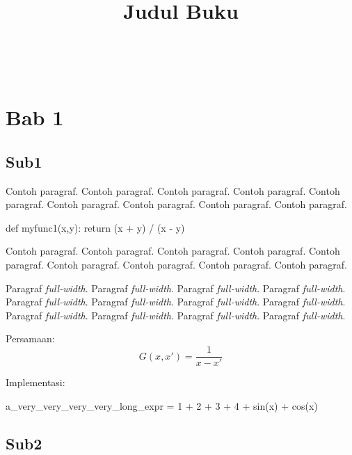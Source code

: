 \documentclass[twoside,bahasa]{tufte-book}
\title{Judul Buku}
\author[Fadjar \& Mariya]{\noindent{Fadjar Fathurrahman} \\[3mm]
\noindent{Mariya Al Qibtiya Nasution} \\[3mm]}
\begin{document}
\maketitle

\frontmatter

\tableofcontents
\listoffigures
\listoftables

\mainmatter

\chapter{Bab 1}

\section{Sub1}

Contoh paragraf. Contoh paragraf. Contoh paragraf. Contoh paragraf.
Contoh paragraf. Contoh paragraf. Contoh paragraf. Contoh paragraf.
Contoh paragraf.

\begin{pythoncode}
def myfunc1(x,y):
    return (x + y) / (x - y)
\end{pythoncode}

Contoh paragraf. Contoh paragraf. Contoh paragraf. Contoh paragraf.
Contoh paragraf. Contoh paragraf. Contoh paragraf. Contoh paragraf.
Contoh paragraf.

\begin{fullwidth}
Paragraf \emph{full-width}. Paragraf \emph{full-width}. Paragraf \emph{full-width}.
Paragraf \emph{full-width}. Paragraf \emph{full-width}. Paragraf \emph{full-width}.
Paragraf \emph{full-width}. Paragraf \emph{full-width}. Paragraf \emph{full-width}.
Paragraf \emph{full-width}. Paragraf \emph{full-width}. Paragraf \emph{full-width}.
\end{fullwidth}


Persamaan:
\begin{equation}
G(x,x') = \frac{1}{x - x'}
\end{equation}


Implementasi:

\begin{fullwidth}
\begin{pythoncode}
a_very_very_very_very_long_expr = 1 + 2 + 3 + 4 + sin(x) + cos(x)
\end{pythoncode}
\end{fullwidth}

\section{Sub2}
\end{document}
